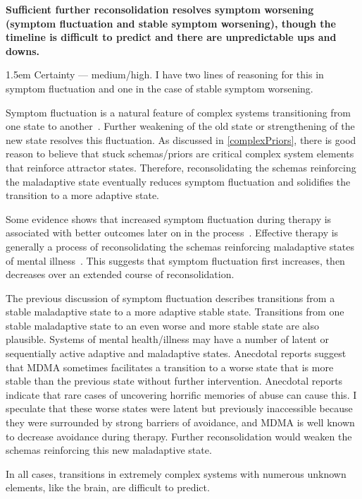 \documentclass[11pt,oneside]{book}
\let\cite\parencite
\newcommand{\claim}[2]{%
    \par\medskip\noindent\textbf{#1}%
    \begin{adjustwidth}{1.5em}{}%
    \setlength{\parindent}{0pt}%
    \setlength{\parskip}{0.5\baselineskip}%
    #2%
    \end{adjustwidth}%
}
\begin{document}
\claim{Sufficient further reconsolidation resolves symptom worsening (symptom fluctuation and stable symptom worsening), though the timeline is difficult to predict and there are unpredictable ups and downs.}{Certainty --- medium/high. I have two lines of reasoning for this in symptom fluctuation and one in the case of stable symptom worsening.

Symptom fluctuation is a natural feature of complex systems transitioning from one state to another~\cite{hayes2020complex}. Further weakening of the old state or strengthening of the new state resolves this fluctuation. As discussed in \cref{complexPriors}, there is good reason to believe that stuck schemas/priors are critical complex system elements that reinforce attractor states. Therefore, reconsolidating the schemas reinforcing the maladaptive state eventually reduces symptom fluctuation and solidifies the transition to a more adaptive state.

Some evidence shows that increased symptom fluctuation during therapy is associated with better outcomes later on in the process~\cite{olthofDestabilization}. Effective therapy is generally a process of reconsolidating the schemas reinforcing maladaptive states of mental illness~\cite{eckerUnlocking}. This suggests that symptom fluctuation first increases, then decreases over an extended course of reconsolidation.

The previous discussion of symptom fluctuation describes transitions from a stable maladaptive state to a more adaptive stable state. Transitions from one stable maladaptive state to an even worse and more stable state are also plausible. Systems of mental health/illness may have a number of latent or sequentially active adaptive and maladaptive states. Anecdotal reports suggest that MDMA sometimes facilitates a transition to a worse state that is more stable than the previous state without further intervention. Anecdotal reports indicate that rare cases of uncovering horrific memories of abuse can cause this. I speculate that these worse states were latent but previously inaccessible because they were surrounded by strong barriers of avoidance, and MDMA is well known to decrease avoidance during therapy. Further reconsolidation would weaken the schemas reinforcing this new maladaptive state.

In all cases, transitions in extremely complex systems with numerous unknown elements, like the brain, are difficult to predict.}
\end{document}

